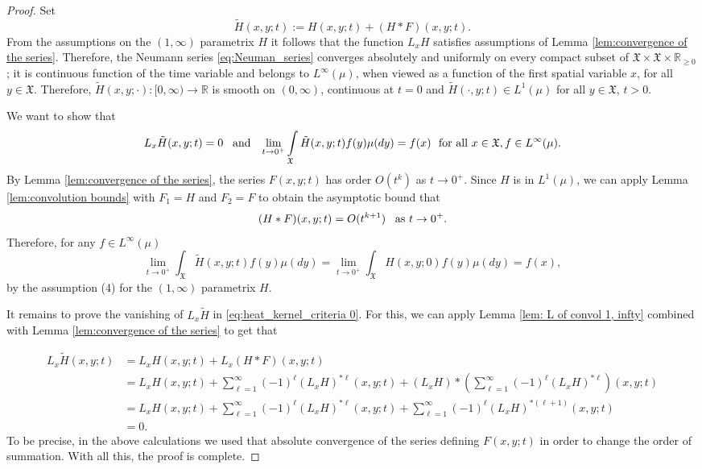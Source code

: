 \documentclass[11pt,reqno]{amsart}
\theoremstyle{remark}
\theoremstyle{definition}
\numberwithin{theorem}{section} \numberwithin{equation}{section}
\newcommand{\X}{\mathfrak{X}}
\begin{document}
\begin{proof}
Set
$$
\tilde{H}(x,y;t) := H(x,y;t)+(H\ast F)(x,y;t).
$$
From the assumptions on the $(1,\infty)$ parametrix $H$ it follows that the function $L_xH$ satisfies assumptions of Lemma \ref{lem:convergence of the series}. Therefore, the Neumann series \eqref{eq:Neuman_series} converges absolutely and uniformly on every compact subset of $\X\times \X\times\mathbb{R}_{\geq 0}$; it is continuous function of the time variable and belongs to $L^{\infty}(\mu)$, when viewed as a function of the first spatial variable $x$, for all $y\in\X$. Therefore,  $\tilde{H}(x,y;\cdot):[0,\infty)\to\mathbb{R}$ is smooth on $(0,\infty)$, continuous at $t=0$ and $\tilde{H}(\cdot,y;t)\in L^1(\mu)$ for all $y\in\X$, $t>0$.

 We want to show that
\begin{equation}\label{eq:heat_kernel_criteria 0}
L_{x}\tilde{H}(x,y;t)=0
\,\,\,\,\,
\text{\rm and}
\,\,\,\,\,
\lim_{t\to0^+}\int\limits_{\X}\tilde H(x,y;t)f(y)\mu(dy)=f(x)
\,\,\,\,
\text{\rm for all $x\in\X, f\in L^\infty(\mu)$.}
\end{equation}
By Lemma \ref{lem:convergence of the series}, the series $F(x,y;t)$
has order $O(t^{k})$ as $t \rightarrow 0^+$.  Since $H$ is in $L^1(\mu)$,
we can apply Lemma \ref{lem:convolution bounds} with $F_1=H$ and $F_2=F$ to obtain the asymptotic bound that
$$
(H\ast F)(x,y;t)= O(t^{k+1})
\,\,\,\,\,
\text{\rm as $t \rightarrow 0^+$.}
$$
Therefore, for any $f\in L^\infty(\mu)$
$$
\lim_{t\to 0^+} \int_{\X}\tilde{H}(x,y;t)f(y)\mu(dy) = \lim_{t\to 0^+}\int_{\X}H (x,y;0)f(y)\mu(dy)=f(x),
$$
by the assumption (4) for the $(1,\infty)$ parametrix $H$.

It remains to prove the vanishing of $L_{x}\tilde{H}$ in \eqref{eq:heat_kernel_criteria 0}. For this, we can apply Lemma \ref{lem: L of convol 1, infty} combined with Lemma \ref{lem:convergence of the series} to get that

\begin{align*}
L_{x}\tilde{H}(x,y;t)&=
L_{x}H(x,y;t)+L_{x}(H\ast F)(x,y;t)
\\&=
L_{x}H(x,y;t)+\sum_{\ell=1}^{\infty}(-1)^{\ell}(L_{x}
{H})^{\ast\ell}(x,y;t)+(L_{x}{H})*\left(\sum_{\ell=1}^{\infty}(-1)^{\ell}(L_{x}{H})^{\ast\ell}\right)(x,y;t)\\&=
L_{x}H(x,y;t)+\sum_{\ell=1}^{\infty}(-1)^{\ell}(L_{x}
{H})^{\ast\ell}(x,y;t)+\sum_{\ell=1}^{\infty}(-1)^{\ell}(L_{x}{H})^{\ast(\ell+1)}(x,y;t)\\&
=0.
\end{align*}
To be precise, in the above calculations we used
that absolute convergence of the series defining $F(x,y;t)$
in order to change the order of summation.  With all this, the proof is complete.
\end{proof}
\end{document}
